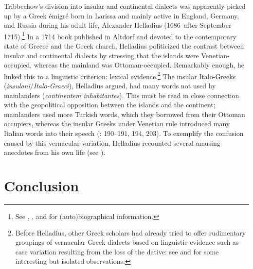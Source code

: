 {Tribbechow’s division into insular and continental dialects was apparently picked up by a Greek émigré born in Larissa and mainly active in England, Germany, and Russia during his adult life, Alexander Helladius (1686–after September 1715).\footnote{See \citet{Helladius1714}, \citet[315--317]{Moennig1998}, and \citet{VanRooyFca} for (auto)biographical information.} In a 1714 book published in Altdorf and devoted to the contemporary state of Greece and the Greek church, Helladius politicized the contrast between insular and continental dialects by stressing that the islands were Venetian-oc\-cu\-pied, whereas the mainland was Ottoman-occupied. Remarkably enough, he linked this to a linguistic criterion: lexical evidence.\footnote{Before Helladius, other Greek scholars had already tried to offer rudimentary groupings of vernacular Greek dialects based on linguistic evidence such as case variation resulting from the loss of the dative: see \citet[108]{Kritopoulos1924} and \citet[(writing ca. 1650) e.g. 1 \& 8]{Nikiforos1908} for some interesting but isolated observations.} The insular Italo-Greeks (\textit{insulani}/\textit{Italo-Graeci}), Helladius argued, had many words not used by mainlanders (\textit{continentem inhabitantes}). This must be read in close connection with the geopolitical opposition between the islands and the continent; mainlanders used more Turkish words, which they borrowed from their Ottoman occupiers, whereas the insular Greeks under Venetian rule introduced many Italian words into their speech (\citealt{Helladius1714}: 190–191, 194, 203). To exemplify the confusion caused by this vernacular variation, Helladius recounted several amusing anecdotes from his own life (see \citet{VanRooyFca}).

\section{Conclusion}\label{sec:2.11}

}
